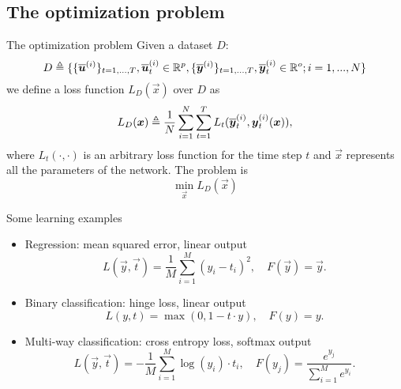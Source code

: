 \subsection{The optimization problem}
\begin{frame}{The optimization problem}
Given a dataset $D$:
\begin{equation}
D\triangleq\{\{\overline{\boldsymbol{u}}^{(i)}\}_{t=1,...,T}, \overline{\boldsymbol{u}}^{(i)}_t \in \mathbb{R}^p, \{\overline{\boldsymbol{y}}^{(i)}\}_{t=1,...,T}, \overline{\boldsymbol{y}}^{(i)}_t \in \mathbb{R}^o;  i=1,...,N\}
\end{equation}
we define a loss function $L_D(\vec{x})$ over $D$  as
\begin{equation}
L_D(\boldsymbol{x})\triangleq\frac{1}{N}\sum_{i=1}^N \sum_{t=1}^T L_t(\overline{\boldsymbol{y}}_t^{(i)},\boldsymbol{y}_t^{(i)}(\boldsymbol{x})),
\end{equation}
where $L_t(\cdot, \cdot)$ is an arbitrary loss function for the time step $t$ and $\vec{x}$ represents all the parameters of the network.
The problem is \begin{equation}
\min_{\vec{x}} L_D(\vec{x})
\end{equation}
\end{frame}

\begin{frame}{Some learning examples}

	\begin{itemize}
		\item Regression: mean squared error, linear output
		\begin{equation}
			L(\vec{y}, \vec{t}) = \frac{1}{M}\sum_{i=1}^M (y_i-t_i)^2, \quad F(\vec{y}) = \vec{y}.
		\end{equation}
		\item Binary classification: hinge loss, linear output
		\begin{equation}
			L(y, t) = \max(0,1-t\cdot y ), \quad F(y) = y.
		\end{equation}
		\item Multi-way classification: cross entropy loss, softmax output
		\begin{equation}
						L(\vec{y}, \vec{t}) = -\frac{1}{M}\sum_{i=1}^M \log(y_i)\cdot t_i, \quad F(y_j) = \frac{e^{y_j}}{\sum_{i=1}^M e^{y_i}}.
		\end{equation}
	\end{itemize}
\end{frame}

